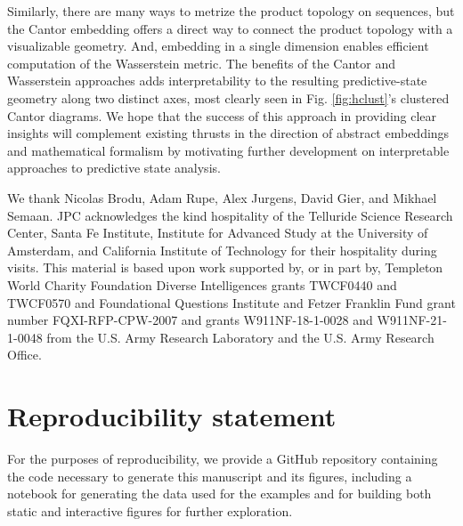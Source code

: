\documentclass[sigconf, anonymous, review]{acmart}
\begin{document}
Similarly, there are many ways to metrize the product topology on sequences, but
the Cantor embedding offers a direct way to connect the product topology with a
visualizable geometry. And, embedding in a single dimension enables efficient
computation of the Wasserstein metric. The benefits of the Cantor and
Wasserstein approaches adds interpretability to the resulting predictive-state
geometry along two distinct axes, most clearly seen in Fig. \ref{fig:hclust}'s
clustered Cantor diagrams. We hope that the success of this approach in
providing clear insights will complement existing thrusts in the direction of
abstract embeddings and mathematical formalism by motivating further development
on interpretable approaches to predictive state analysis.

\begin{acks}
We thank Nicolas Brodu, Adam Rupe, Alex Jurgens, David Gier, and Mikhael
Semaan. JPC acknowledges the kind hospitality of the Telluride Science
Research Center, Santa Fe Institute, Institute for Advanced Study at the
University of Amsterdam, and California Institute of Technology for their
hospitality during visits. This material is based upon work supported by, or
in part by, Templeton World Charity Foundation Diverse Intelligences grants TWCF0440 and TWCF0570 and Foundational Questions Institute and Fetzer Franklin Fund grant number FQXI-RFP-CPW-2007 and grants W911NF-18-1-0028 and
W911NF-21-1-0048 from the U.S. Army Research Laboratory and the U.S. Army
Research Office.  

\end{acks}

\section{Reproducibility statement}
For the purposes of reproducibility, we provide a 
GitHub repository \cite{repo} containing
the code necessary to generate this manuscript and its figures, including a
notebook for generating the data used for the examples and for building both
static and interactive figures for further exploration.



\end{document}
